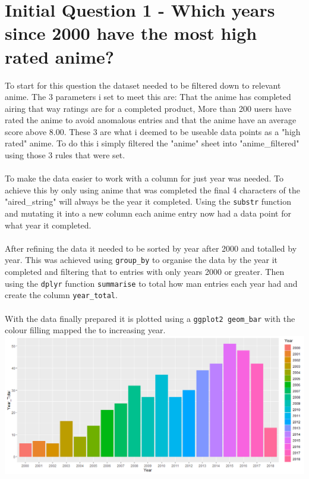 \documentclass[a4paper]{article}
\begin{document}
	\section* {Initial Question 1 - Which years since 2000 have the most high rated anime?}
	To start for this question the dataset needed to be filtered down to relevant anime. The 3 parameters i set to meet this are: That the anime has completed airing that way ratings are for a completed product, More than 200 users have rated the anime to avoid anomalous entries and that the anime have an average score above 8.00. These 3 are what i deemed to be useable data points as a "high rated" anime. To do this i simply filtered the "anime" sheet into "anime\_filtered" using those 3 rules that were set.\\
	\\
	To make the data easier to work with a column for just year was needed. To achieve this by only using anime that was completed the final 4 characters of the "aired\_string" will always be the year it completed. Using the \texttt{substr} function and mutating it into a new column each anime entry now had a data point for what year it completed.\\
	\\
	After refining the data it needed to be sorted by year after 2000 and totalled by year. This was achieved using \texttt{group\_by} to organise the data by the year it completed and filtering that to entries with only years 2000 or greater. Then using the \texttt{dplyr} function \texttt{summarise} to total how man entries each year had and create the column \texttt{year\_total}.\\
	\\
	With the data finally prepared it is plotted using a \texttt{ggplot2 geom\_bar} with the colour filling mapped the to increasing year.\\
	\noindent\includegraphics[scale=0.55]{TopAnimeByYear.png}
	
\end{document}
